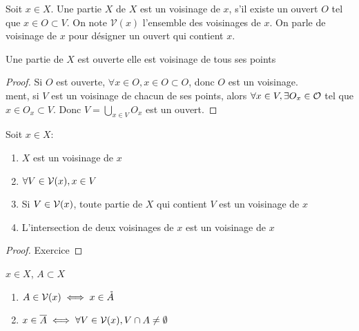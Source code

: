 \documentclass[]{report}
\begin{document}
    \begin{df}{}{}
        Soit $x\in X$. Une partie $X$ de $X$ est un voisinage de $x$, s'il existe un ouvert $O$ tel que $x\in O\subset V$. On note $\mathcal{V}(x)$ l'ensemble des voisinages de $x$. On parle de voisinage de $x$ pour désigner un ouvert qui contient $x$.
    \end{df}

    \begin{re}{}{}
        Une partie de $X$ est ouverte \ssi elle est voisinage de tous ses points
    \end{re}

    \begin{proof}{}{}
        Si $O$ est ouverte, $\forall x\in O,x\in O\subset O$, donc $O$ est un voisinage.\\
        ment, si $V$ est un voisinage de chacun de ses points, alors $\forall x\in V,\exists O_x\in\mathcal{O}$ tel que $x\in O_x\subset V$. Donc $V=\bigcup_{x\in V}O_x$ est un ouvert.
    \end{proof}

    \begin{prop}{}{}
        Soit $x\in X$:
        \begin{enumerate}
            \item $X$ est un voisinage de $x$
            \item $\forall V\in\mathcal{V}(x),x\in V$
            \item Si $V\in\mathcal{V}(x)$, toute partie de $X$ qui contient $V$ est un voisinage de $x$
            \item L'intersection de deux voisinages de $x$ est un voisinage de $x$
        \end{enumerate}
    \end{prop}

    \begin{proof}{}{}
        Exercice
    \end{proof}

    \begin{prop}{}{}
        $x\in X$, $A\subset X$
        \begin{enumerate}
            \item $A\in \mathcal{V}(x)\iff x\in \mathring{A}$
            \item $x\in \overline{A}\iff \forall V\in\mathcal{V}(x),V\cap A\neq \emptyset$
        \end{enumerate}
    \end{prop}
\end{document}
